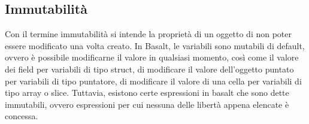 \subsection{Immutabilità}
Con il termine immutabilità si intende la proprietà di un oggetto di non poter essere modificato una volta creato. In Basalt, le variabili
sono mutabili di default, ovvero è possibile modificarne il valore in qualsiasi momento, così come il valore dei field per variabili 
di tipo struct, di modificare il valore dell'oggetto puntato per variabili di tipo puntatore, di modificare il valore di una cella per 
variabili di tipo array o slice. Tuttavia, esistono certe espressioni in basalt che sono dette immutabili, ovvero espressioni per cui 
nessuna delle libertà appena elencate è concessa.




